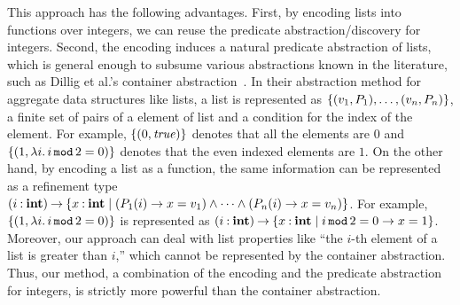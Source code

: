 


This approach has the following advantages.  First, by encoding lists
into functions over integers, we can reuse the predicate
abstraction/discovery for integers.  Second, the encoding induces a
natural predicate abstraction of lists, which is general enough to
subsume various abstractions known in the literature, such as Dillig et
al.'s container abstraction~\cite{Dillig2011}.  In their abstraction
method for aggregate data structures like lists, a list is represented
as $\{{(v_1,P_1), \dots, (v_n,P_n)}\}$, a finite set of pairs of a
element of list and a condition for the index of the element.  For
example, $\{{(0,\mathit{true})}\}$ denotes that all the elements are $0$ and
$\{{(1,\lambda{i}.\,{i \mathop{\mathtt{mod}} 2 = 0})}\}$ denotes that the even
indexed elements are $1$.  On the other hand, by encoding a list as a
function, the same information can be represented as a refinement type
${(i\mathbin{:}\mathbf{int})}\mathbin{\rightarrow}{\{{x\mathbin{:}\mathbf{int}\mid (P_1(i) \to x=v_1) \wedge \dots
\wedge (P_n(i) \to x=v_n)}\}}$.  For example, $\{{(1,\lambda{i}.\,{i
\mathop{\mathtt{mod}} 2 = 0})}\}$ is represented as
${(i\mathbin{:}\mathbf{int})}\mathbin{\rightarrow}{\{{x\mathbin{:}\mathbf{int}\mid i \mathop{\mathtt{mod}} 2 = 0 \to x=1}\}}$.  Moreover, our
approach can deal with list properties like ``the $i$-th
element of a list is greater than $i$,'' which cannot be represented by
the container abstraction.  Thus, our method, a combination of the encoding
and the predicate abstraction for integers, is strictly more powerful
than the container abstraction.

